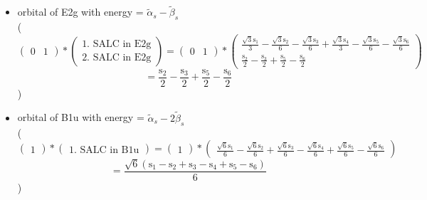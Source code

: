 \documentclass[12pt,a4paper]{article}
\begin{document}
\begin{itemize}
\item orbital of E2g with energy = 
                                $\tilde{\alpha}_{s} - \tilde{\beta}_{s}$ \\
( 
$$
\begin{pmatrix}0 & 1\end{pmatrix} * \left(\begin{array}{c}\text{1. SALC in E2g} \\ \text{2. SALC in E2g}\end{array}\right) = \begin{pmatrix}0 & 1\end{pmatrix} * \begin{pmatrix}\frac{\sqrt{3} \text{s}_{1}}{3} - \frac{\sqrt{3} \text{s}_{2}}{6} - \frac{\sqrt{3} \text{s}_{3}}{6} + \frac{\sqrt{3} \text{s}_{4}}{3} - \frac{\sqrt{3} \text{s}_{5}}{6} - \frac{\sqrt{3} \text{s}_{6}}{6}\\\frac{\text{s}_{2}}{2} - \frac{\text{s}_{3}}{2} + \frac{\text{s}_{5}}{2} - \frac{\text{s}_{6}}{2}\end{pmatrix} 
 $$ $$ = \frac{\text{s}_{2}}{2} - \frac{\text{s}_{3}}{2} + \frac{\text{s}_{5}}{2} - \frac{\text{s}_{6}}{2} 
 $$ 
 )

\item orbital of B1u with energy = 
                                $\tilde{\alpha}_{s} - 2 \tilde{\beta}_{s}$ \\
( 
$$
\begin{pmatrix}1\end{pmatrix} * \left(\begin{array}{c}\text{1. SALC in B1u}\end{array}\right) = \begin{pmatrix}1\end{pmatrix} * \begin{pmatrix}\frac{\sqrt{6} \text{s}_{1}}{6} - \frac{\sqrt{6} \text{s}_{2}}{6} + \frac{\sqrt{6} \text{s}_{3}}{6} - \frac{\sqrt{6} \text{s}_{4}}{6} + \frac{\sqrt{6} \text{s}_{5}}{6} - \frac{\sqrt{6} \text{s}_{6}}{6}\end{pmatrix} 
 $$ $$ = \frac{\sqrt{6} \left(\text{s}_{1} - \text{s}_{2} + \text{s}_{3} - \text{s}_{4} + \text{s}_{5} - \text{s}_{6}\right)}{6} 
 $$ 
 )

\end{itemize}
\end{document}
